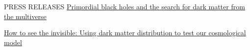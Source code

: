 \begin{rSection}{PRESS RELEASES}
    \href{https://www.ipmu.jp/en/20201224-PBH-multiverse}{Primordial black holes and the search for dark matter from the multiverse}
  
    \href{https://www.ipmu.jp/en/20230404-darkmatter}{How to see the invisible: Using dark matter distribution to test our cosmological model}
\end{rSection}